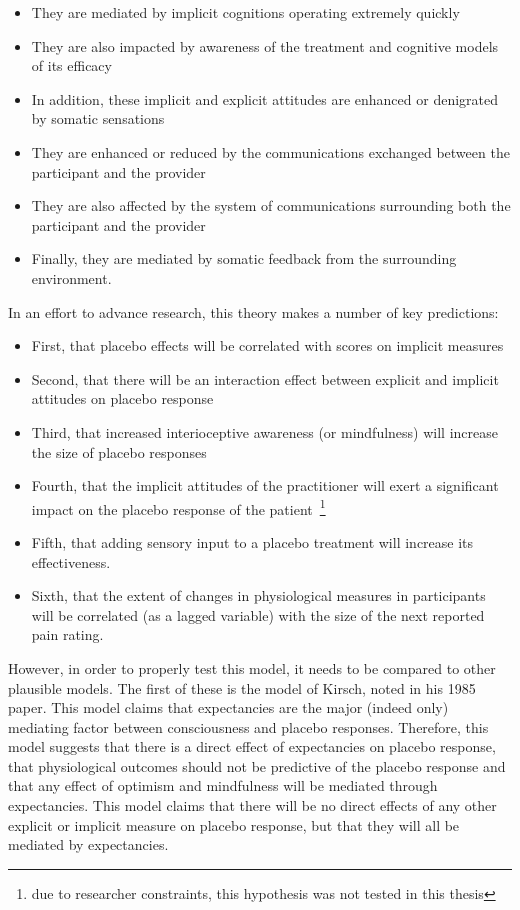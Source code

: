 \begin{itemize}
\item They are mediated by implicit cognitions operating extremely quickly
\item They are also impacted by awareness of the treatment and cognitive models of its efficacy
\item In addition, these implicit and explicit attitudes are enhanced or denigrated by somatic sensations
\item They are enhanced or reduced by the communications exchanged between the participant and the provider
\item They are also affected by the system of communications surrounding both the participant and the provider
\item Finally, they are mediated by somatic feedback from the surrounding environment.
\end{itemize}
 
In an effort to advance research, this theory makes a number of key predictions:

\begin{itemize}
\item First, that placebo effects will be correlated with scores on implicit measures
\item Second, that there will be an interaction effect between explicit and implicit attitudes on placebo response
\item Third, that increased interioceptive awareness (or mindfulness) will increase the size of placebo responses
\item Fourth, that the implicit attitudes of the practitioner will exert a significant impact on the placebo response of the patient~\footnote{due to researcher constraints, this hypothesis was not tested in this thesis}
\item Fifth, that adding sensory input to a placebo treatment will increase its effectiveness. 
\item Sixth, that the extent of changes in physiological measures in participants will be correlated (as a lagged variable) with the size of the next reported pain rating.
\end{itemize}

However, in order to properly test this model, it needs to be compared to other plausible models. The first of these is the model of Kirsch, noted in his 1985 paper. This model claims that expectancies are the major (indeed only) mediating factor between consciousness and placebo responses. Therefore, this model suggests that there is a direct effect of expectancies on placebo response, that physiological outcomes should not be predictive of the placebo response and that any effect of optimism and mindfulness will be mediated through expectancies. This model claims that there will be no direct effects of any other explicit or implicit measure on placebo response, but that they will all be mediated by expectancies. 

